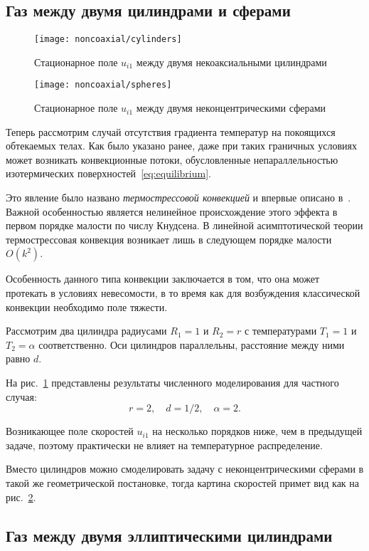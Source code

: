 \documentclass[english,russian,a4paper,10pt]{article}
\begin{document}
\subsection{Газ между двумя цилиндрами и сферами}

\begin{figure}[ht]
	\centering
	\texttt{[image: noncoaxial/cylinders]}
	\caption{Стационарное поле \(u_{i1}\) между двумя некоаксиальными цилиндрами}\label{fig:cylinders}
\end{figure}

\begin{figure}
	\centering
	\texttt{[image: noncoaxial/spheres]}
	\caption{Стационарное поле \(u_{i1}\) между двумя неконцентрическими сферами}\label{fig:spheres}
\end{figure}

Теперь рассмотрим случай отсутствия градиента температур на покоящихся обтекаемых телах.
Как было указано ранее, даже при таких граничных условиях может возникать конвекционные потоки,
обусловленные непараллельностью изотермических поверхностей~\eqref{eq:equilibrium}.

Это явление было названо \textit{термострессовой конвекцией} и впервые описано в~\cite{Kogan1971}.
Важной особенностью является нелинейное происхождение этого эффекта в первом порядке малости по числу Кнудсена.
В линейной асимптотической теории термострессовая конвекция возникает лишь в следующем порядке малости \(O(k^2)\).

Особенность данного типа конвекции заключается в том, что она может протекать в условиях невесомости,
в то время как для возбуждения классической конвекции необходимо поле тяжести.

Рассмотрим два цилиндра радиусами \(R_1=1\) и \(R_2=r\)
с температурами \(T_1=1\) и \(T_2=\alpha\) соответственно.
Оси цилиндров параллельны, расстояние между ними равно \(d\).

На рис.~\ref{fig:cylinders} представлены результаты численного моделирования для частного случая:
\[ r = 2, \quad d = 1/2, \quad \alpha = 2.\]

Возникающее поле скоростей \(u_{i1}\) на несколько порядков ниже, чем в предыдущей задаче, поэтому практически не влияет на температурное распределение.

Вместо цилиндров можно смоделировать задачу с неконцентрическими сферами в такой же геометрической постановке,
тогда картина скоростей примет вид как на рис.~\ref{fig:spheres}.

\subsection{Газ между двумя эллиптическими цилиндрами}
\end{document}
